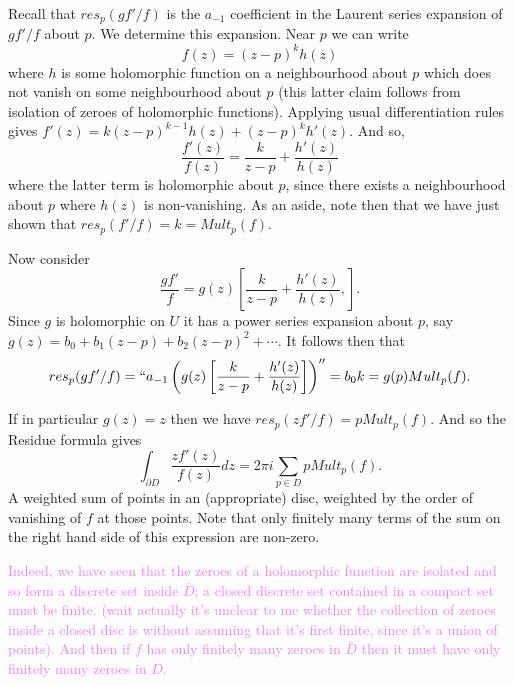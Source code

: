 \documentclass[12pt,letterpaper,boxed]{hmcpset}
\newcommand{\wg}[1]{\textcolor{violet}{#1}}
\begin{document}
\begin{solution}
Recall that $res_p(gf'/f)$ is the $a_{-1}$ coefficient in the Laurent
series expansion of $gf'/f$ about $p$. We determine this expansion.
Near $p$ we can write
\[
	f(z) = (z-p)^k h(z)
\]
where $h$ is some
holomorphic function on a neighbourhood about $p$ which does not
vanish on some neighbourhood about $p$ (this latter claim follows from
isolation of zeroes of holomorphic functions).
Applying usual differentiation rules gives $f'(z) = k(z-p)^{k-1} h(z)
+ (z-p)^k h'(z)$. And so,
\[
	\frac{f'(z)}{f(z)} = 
	\frac{k}{z-p} + \frac{h'(z)}{h(z)}
\]
where the latter term is holomorphic about $p$, since there exists a
neighbourhood about $p$ where $h(z)$ is non-vanishing. As an aside,
note then that we have just shown that $res_p(f'/f) = k = Mult_p(f)$. 

Now consider 
\[
	\frac{gf'}{f} = g(z) \left[
	\frac{k}{z-p} + \frac{h'(z)}{h(z)},
	\right].
\]
Since $g$ is holomorphic on $U$ it has a power series expansion about
$p$, say $g(z) = b_0 + b_1(z-p) + b_2(z-p)^2 + \cdots$. 
It follows then that
\[
	res_p(gf'/f) = ``a_{-1}\left(g(z)\left[
		\frac{k}{z-p} + \frac{h'(z)}{h(z)}
	\right]\right)'' = b_0 k = g(p)Mult_p(f).
\]

If in particular $g(z) = z$ then we have $res_p(zf'/f) = p Mult_p(f)$. 
And so the Residue formula gives \[
\int_{\partial D} \frac{z f'(z)}{f(z)} dz = 2\pi i \sum_{p \in D} p
Mult_p(f). 
\]
A weighted sum of points in an (appropriate) disc, weighted by the
order of vanishing of $f$ at those points. Note that only finitely
many terms of the sum on the right hand side of this expression are
non-zero. 

\wg{Indeed, we have seen that the zeroes of a holomorphic function
are isolated and so form a discrete set inside $\bar D$; a closed
discrete set contained in a compact set must be finite. (wait actually
it's unclear to me whether the collection of zeroes inside a closed
disc is without assuming that it's first finite, since it's a union of
points). And then if
$f$ has only finitely many zeroes in $\bar D$ then it must have only
finitely many zeroes in $D$.}

\end{solution}

\newpage
\end{document}
